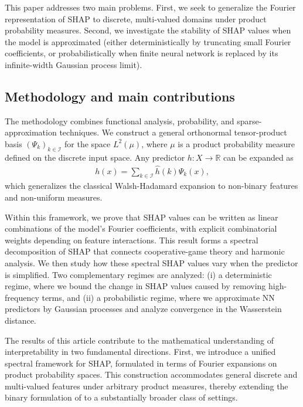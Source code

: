 \documentclass[letterpaper,11pt]{article}
\numberwithin{equation}{section}
\numberwithin{equation}{section}
\begin{document}
This paper addresses two main problems. First, we seek to generalize the Fourier representation of SHAP to discrete, multi-valued domains under product probability measures. Second, we investigate the stability of SHAP values when the model is approximated (either deterministically by truncating small Fourier coefficients, or probabilistically when finite neural network is replaced by its infinite-width Gaussian process limit).%

\subsection{Methodology and main contributions}
The methodology combines functional analysis, probability, and sparse-approximation techniques. We construct a general orthonormal tensor-product basis $(\Psi_k)_{k\in \mathcal{I}}$ for the space $L^2(\mu)$, where $\mu$ is a product probability measure defined on the discrete input space. Any predictor $h:X\to \mathbb{R}$ can be expanded as
\begin{align*}
    h(x)=\sum_{k\in \mathcal{I}} \hat{h}(k) \Psi_k(x),
\end{align*}
which generalizes the classical Walsh-Hadamard expansion to non-binary features and non-uniform measures.

Within this framework, we prove that SHAP values can be written as linear combinations of the model's Fourier coefficients, with explicit combinatorial weights depending on feature interactions. This result forms a spectral decomposition of SHAP that connects cooperative-game theory and harmonic analysis. We then study how these spectral SHAP values vary when the predictor is simplified. Two complementary regimes are analyzed: (i) a deterministic regime, where we bound the change in SHAP values caused by removing high-frequency terms, and (ii) a probabilistic regime, where we approximate NN predictors by Gaussian processes and analyze convergence in the Wasserstein distance. %

The results of this article contribute to the mathematical understanding of interpretability in two fundamental directions. First, we introduce a unified spectral framework for SHAP, formulated in terms of Fourier expansions on product probability spaces. This construction accommodates general discrete and multi-valued features under arbitrary product measures, thereby extending the binary formulation of \cite{gorji2024shap} to a substantially broader class of settings.
\end{document}
